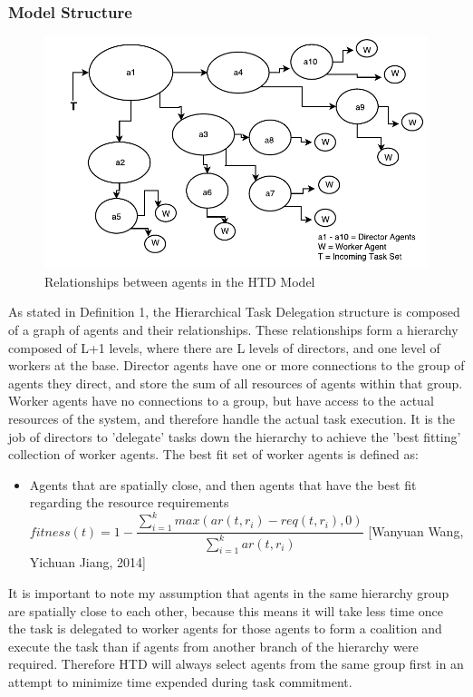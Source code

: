 \documentclass[12pt,letterpaper,onecolumn]{article}
\begin{document}
	\subsubsection{Model Structure}
	\begin{figure}
		\centerline{\includegraphics{HTDModel.pdf}}
		\caption{Relationships between agents in the HTD Model}
	\end{figure}
	As stated in Definition 1, the Hierarchical Task Delegation structure is composed of a graph of agents and their relationships. These relationships form a hierarchy composed of L+1 levels, where there are L levels of directors, and one level of workers at the base. Director agents have one or more connections to the group of agents they direct, and store the sum of all resources of agents within that group. Worker agents have no connections to a group, but have access to the actual resources of the system, and therefore handle the actual task execution. It is the job of directors to 'delegate' tasks down the hierarchy to achieve the 'best fitting' collection of worker agents. The best fit set of worker agents is defined as:
	\begin{itemize}
		\item Agents that are spatially close, and then agents that have the best fit regarding the resource requirements $fitness(t) = 1 - \dfrac{\sum_{i=1}^{k} max(ar(t, r_{i}) - req(t, r_{i}), 0)}{\sum_{i=1}^{k} ar(t, r_{i})} $ [Wanyuan Wang, Yichuan Jiang, 2014]
	\end{itemize}
	It is important to note my assumption that agents in the same hierarchy group are spatially close to each other, because this means it will take less time once the task is delegated to worker agents for those agents to form a coalition and execute the task than if agents from another branch of the hierarchy were required. Therefore HTD will always select agents from the same group first in an attempt to minimize time expended during task commitment.
	
\end{document}

